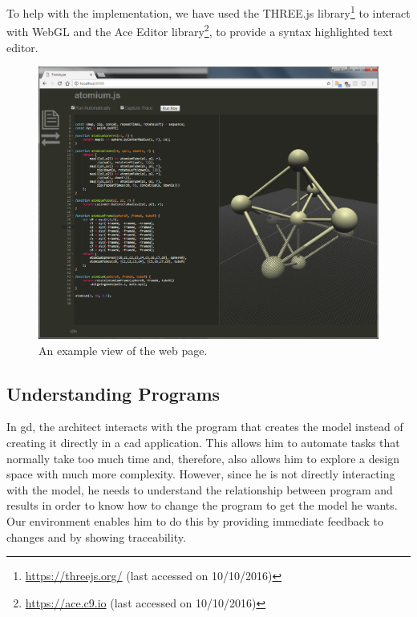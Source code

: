 To help with the implementation, we have used the THREE.js library\footnote{\url{https://threejs.org/} (last accessed on 10/10/2016)} to interact with WebGL\cite{marrin2011webgl} and the Ace Editor library\footnote{\url{https://ace.c9.io} (last accessed on 10/10/2016)}, to provide a syntax highlighted text editor.


\begin{figure}
  \centering
  \includegraphics[width=12cm]{./images/webpage_view}
  \caption{An example view of the web page.}
  \label{fig:page:view}
\end{figure}


\subsection{Understanding Programs}
In \gls{gd}, the architect interacts with the program that creates the model instead of creating it directly in a \gls{cad} application.
This allows him to automate tasks that normally take too much time and, therefore, also allows him to explore a design space with much more complexity.
However, since he is not directly interacting with the model, he needs to understand the relationship between program and results in order to know how to change the program to get the model he wants.
Our environment enables him to do this by providing immediate feedback to changes and by showing traceability.


